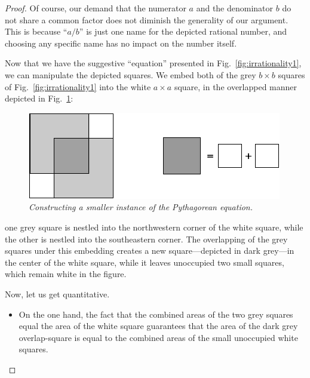 \begin{proof}
{\begin{minipage}{0.96\textwidth}
Of course, our demand that the numerator $a$ and the denominator $b$ do not share a common factor does not diminish the generality of our argument.  This is because ``$a/b$'' is just one name for the depicted rational number, and choosing any specific name has no impact on the number itself.
\end{minipage}
}
\bigskip

Now that we have the suggestive ``equation'' presented in Fig.~\ref{fig:irrationality1}, we can manipulate the depicted squares.  We embed both of the grey $b \times b$ squares of
Fig.~\ref{fig:irrationality1} into the white $a \times a$ square, in the overlapped manner depicted in Fig.~\ref{fig:irrationality2}:
\begin{figure}[htb]
\begin{center}
       \includegraphics[scale=0.4]{FiguresArithmetic/sqrt2final}
\caption{{\it Constructing a smaller instance of the Pythagorean equation.}
\label{fig:irrationality2}}
\end{center}
\end{figure}
one grey square is nestled into the northwestern corner of the white square, while the other is nestled into the southeastern corner.  The overlapping of the grey squares under this embedding creates a new square---depicted in dark grey---in the center of the white square, while it leaves unoccupied two small squares, which remain white in the figure.

\smallskip

Now, let us get quantitative.
\begin{itemize}
\item
On the one hand, the fact that the combined areas of the two grey squares equal the area of the white square guarantees that the area of the dark grey overlap-square is equal to the combined areas of the small unoccupied white squares.


\end{itemize}
\end{proof}
